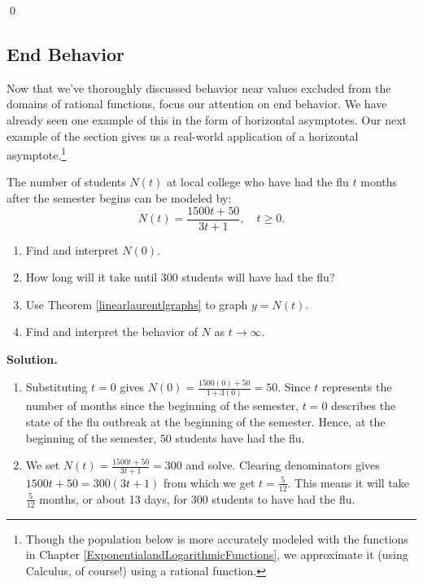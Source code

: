\begin{ex}
\begin{ex}
\begin{enumerate}
\end{enumerate}
\qed
\end{ex}

\subsection{End Behavior}
\label{ebrationalsection}

Now that we've thoroughly discussed behavior near values excluded from the domains of rational functions, focus our attention on  end behavior.  We have already seen one example of this in the form of horizontal asymptotes.  Our next example of the section gives us a real-world application of a horizontal asymptote.\footnote{Though the population below is more accurately modeled with the functions in Chapter \ref{ExponentialandLogarithmicFunctions}, we approximate it (using Calculus, of course!) using a rational function.}

\begin{ex}  \label{fluex} The number of students $N(t)$ at local college who have had the flu $t$ months after the semester begins can be modeled by: \[ N(t) = \dfrac{1500t + 50}{3t+1},  \quad t \geq 0.\]

\begin{enumerate}

\item  Find and interpret $N(0)$.

\item  How long will it take until $300$ students will have had the flu?

\item  Use Theorem \ref{linearlaurentlgraphs} to graph $y = N(t)$.  

\item  Find and interpret the behavior of $N$ as $t \rightarrow \infty$.  

\end{enumerate}

{ \bf Solution.}

\begin{enumerate}

\item  Substituting $t=0$ gives $N(0) = \frac{1500(0) + 50}{1+3(0)} = 50$.  Since $t$ represents the number of months since the beginning of the semester, $t=0$ describes the state of the flu outbreak at the beginning of the semester. Hence,  at the beginning of the semester, $50$ students have had the flu.

\item  We set $N(t) = \frac{1500t + 50}{3t+1}  = 300$ and solve.  Clearing denominators gives $1500t + 50 = 300(3t+1)$ from which we get $t = \frac{5}{12}$.  This means it will take $\frac{5}{12}$ months, or about 13 days, for $300$ students to have had the flu.


\end{enumerate}
\end{ex}
\end{ex}
